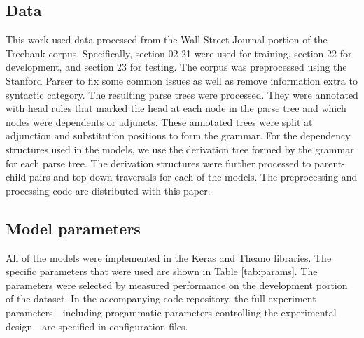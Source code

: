 \documentclass[11pt]{article}
\begin{document}
\subsection{Data}

This work used data processed from the Wall Street Journal portion of the Treebank corpus. Specifically, section 02-21 were used for training, section 22 for development, and section 23 for testing.  The corpus was preprocessed using the Stanford Parser to fix some common issues as well as remove information extra to syntactic category.  The resulting parse trees were processed.  They were annotated with head rules that marked the head at each node in the parse tree and which nodes were dependents or adjuncts.  These annotated trees were split at adjunction and substitution positions to form the grammar.  For the dependency structures used in the models, we use the derivation tree formed by the grammar for each parse tree.  The derivation structures were further processed to parent-child pairs and top-down traversals for each of the models.  The preprocessing and processing code are distributed with this paper. 

\subsection{Model parameters}

All of the models were implemented in the Keras \cite{chollet2015keras} and Theano \cite{theano} libraries.  The specific parameters that were used are shown in Table \ref{tab:params}.  The parameters were selected by measured performance on the development portion of the dataset.  In the accompanying code repository, the full experiment parameters---including progammatic parameters controlling the experimental design---are specified in configuration files. 
\end{document}
